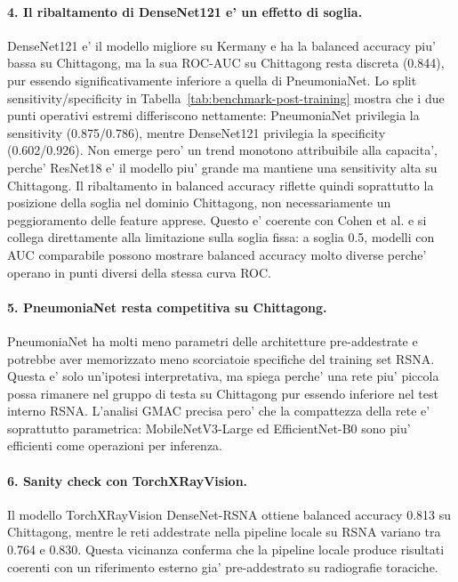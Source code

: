 \documentclass[11pt,a4paper]{article}
\newcommand{\balacc}{balanced accuracy}
\begin{document}
\paragraph{4. Il ribaltamento di DenseNet121 e' un effetto di soglia.}
DenseNet121 e' il modello migliore su Kermany e ha la \balacc{} piu' bassa su
Chittagong, ma la sua ROC-AUC su Chittagong resta discreta (0.844), pur essendo
significativamente inferiore a quella di PneumoniaNet. Lo split
sensitivity/specificity in Tabella~\ref{tab:benchmark-post-training} mostra che
i due punti operativi estremi differiscono nettamente: PneumoniaNet privilegia
la sensitivity (0.875/0.786), mentre DenseNet121 privilegia la specificity
(0.602/0.926). Non emerge pero' un trend monotono attribuibile alla capacita',
perche' ResNet18 e' il modello piu' grande ma mantiene una sensitivity alta su
Chittagong. Il ribaltamento in \balacc{} riflette quindi soprattutto la
posizione della soglia nel dominio Chittagong, non necessariamente un
peggioramento delle feature apprese. Questo e' coerente con Cohen et al.
\cite{cohen2020limits} e si collega direttamente alla limitazione sulla soglia
fissa: a soglia 0.5, modelli con AUC comparabile possono mostrare \balacc{}
molto diverse perche' operano in punti diversi della stessa curva ROC.

\paragraph{5. PneumoniaNet resta competitiva su Chittagong.}
PneumoniaNet ha molti meno parametri delle architetture pre-addestrate e potrebbe
aver memorizzato meno scorciatoie specifiche del training set RSNA. Questa e'
solo un'ipotesi interpretativa, ma spiega perche' una rete piu' piccola possa
rimanere nel gruppo di testa su Chittagong pur essendo inferiore nel test
interno RSNA. L'analisi GMAC precisa pero' che la compattezza della rete e'
soprattutto parametrica: MobileNetV3-Large ed EfficientNet-B0 sono piu'
efficienti come operazioni per inferenza.

\paragraph{6. Sanity check con TorchXRayVision.}
Il modello TorchXRayVision DenseNet-RSNA ottiene \balacc{} 0.813 su Chittagong,
mentre le reti addestrate nella pipeline locale su RSNA variano tra 0.764 e
0.830. Questa vicinanza conferma che la pipeline locale produce risultati
coerenti con un riferimento esterno gia' pre-addestrato su radiografie toraciche.
\end{document}
